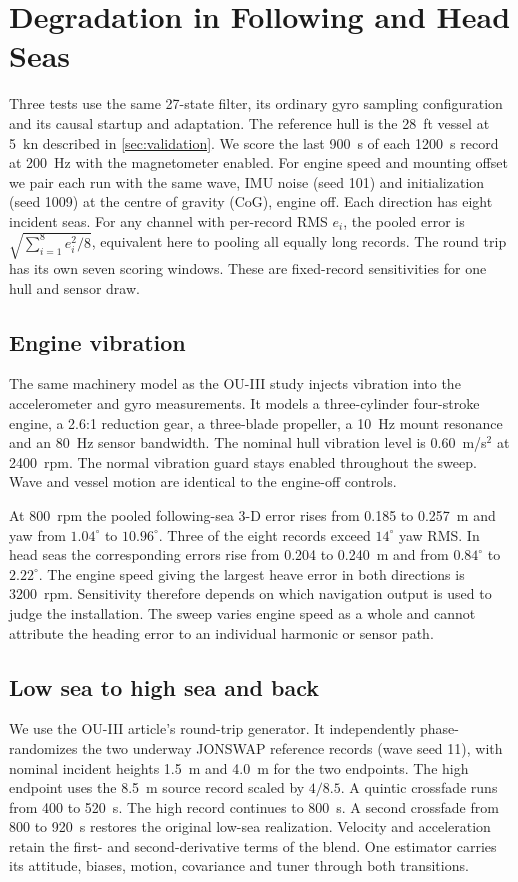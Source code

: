 \documentclass[conference]{IEEEtran}
\begin{document}
\section{Degradation in Following and Head Seas}
\label{sec:underway-degradation}
Three tests use the same 27-state filter, its ordinary gyro sampling configuration
and its causal startup and adaptation. The reference hull is the 28~ft vessel
at 5~kn described in \cref{sec:validation}. We score the last 900~s of each
1200~s record at 200~Hz with the magnetometer enabled. For engine speed and
mounting offset we pair each run with the same wave, IMU noise (seed 101) and
initialization (seed 1009) at the centre of gravity (CoG), engine off. Each
direction has eight incident seas. For any channel with per-record RMS $e_i$,
the pooled error is $\sqrt{\sum_{i=1}^8 e_i^2/8}$, equivalent here to pooling
all equally long records. The round trip has its own seven scoring windows.
These are fixed-record sensitivities for one hull and sensor draw.

\subsection{Engine vibration}
The same machinery model as the OU-III study injects vibration into the
accelerometer and gyro measurements. It models a three-cylinder four-stroke
engine, a 2.6:1 reduction gear, a three-blade propeller, a 10~Hz mount resonance
and an 80~Hz sensor bandwidth. The nominal hull vibration level is
0.60~m/s$^2$ at 2400~rpm. The normal vibration guard stays enabled throughout
the sweep. Wave and vessel motion are identical to the engine-off controls.



At 800~rpm the pooled following-sea 3-D error rises from 0.185 to 0.257~m
and yaw from $1.04^\circ$ to $10.96^\circ$. Three of the eight records exceed
$14^\circ$ yaw RMS. In head seas the corresponding errors rise from 0.204 to
0.240~m and from $0.84^\circ$ to $2.22^\circ$. The engine speed giving
the largest heave error in both directions is 3200~rpm. Sensitivity therefore
depends on which navigation output is used to judge the installation.
The sweep varies engine speed as a whole and cannot attribute the heading
error to an individual harmonic or sensor path.

\subsection{Low sea to high sea and back}
We use the OU-III article's round-trip generator. It independently phase-randomizes
the two underway JONSWAP reference records (wave seed 11), with nominal incident
heights 1.5~m and 4.0~m for the two endpoints. The high endpoint uses the 8.5~m
source record scaled by $4/8.5$. A quintic crossfade runs from 400 to 520~s.
The high record continues to 800~s. A second crossfade from 800 to 920~s restores
the original low-sea realization. Velocity and acceleration retain the first-
and second-derivative terms of the blend. One estimator carries its attitude,
biases, motion, covariance and tuner through both transitions.
\end{document}
